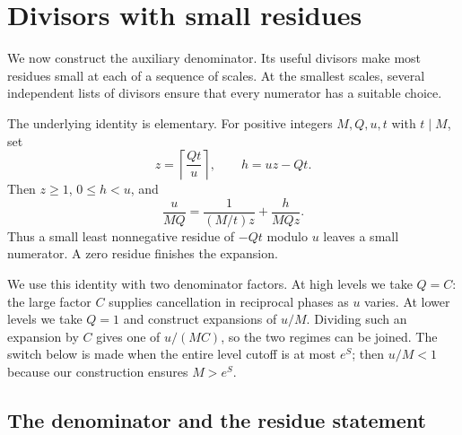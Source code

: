 \section{Divisors with small residues}\label{sec:residues}

We now construct the auxiliary denominator.
Its useful divisors make most residues small at each of a sequence of
scales.  At the smallest scales, several independent lists of divisors
ensure that every numerator has a suitable choice.

The underlying identity is elementary.  For positive integers \(M,Q,u,t\)
with \(t\mid M\), set
\[
 z=\left\lceil\frac{Qt}{u}\right\rceil,
 \qquad h=uz-Qt.
\]
Then \(z\ge1\), \(0\le h<u\), and
\begin{equation}\label{eq:residue-step}
 \frac{u}{MQ}=\frac{1}{(M/t)z}+\frac{h}{MQz}.
\end{equation}
Thus a small least nonnegative residue of \(-Qt\) modulo \(u\)
leaves a small numerator.  A zero residue finishes the expansion.

We use this identity with two denominator factors. At high levels we
take \(Q=C\): the large factor \(C\) supplies cancellation in
reciprocal phases as \(u\) varies. At lower levels we take \(Q=1\)
and construct expansions of \(u/M\). Dividing such an expansion by
\(C\) gives one of \(u/(MC)\), so the two regimes can be joined.
The switch below is made when the entire level cutoff is at most
\(e^S\); then \(u/M<1\) because our construction ensures \(M>e^S\).

\subsection{The denominator and the residue statement}

